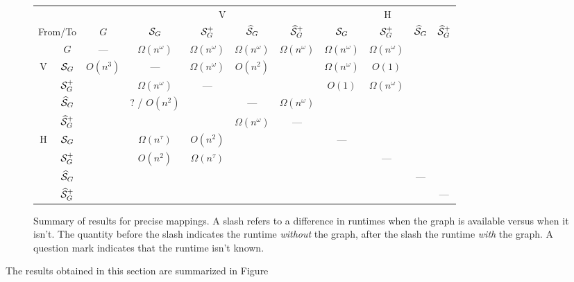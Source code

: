 \begin{figure}
	\centering
	\renewcommand{\arraystretch}{1.5}	\begin{tabular}{|c|c|c|c|c|c|c|c|c|c|c|}
		\hline 
		\multicolumn{3}{|c|}{} & \multicolumn{4}{c|}{\textsf{V}} & \multicolumn{4}{c|}{\textsf{H}}\\
	\cline{3-11} 
\multicolumn{2}{|r|}{From/To} & $G$ & $\mathcal{S}_G$ & $\mathcal{S}_G^+$ & $\widehat{\mathcal{S}}_G$ & $\widehat{\mathcal{S}}_G^+$ & $\mathcal{S}_G$ & $\mathcal{S}_G^+$ & $\widehat{\mathcal{S}}_G$ & $\widehat{\mathcal{S}}_G^+$ \\
\cline{2-11} 
& $G$ & --- &$\Omega(n^\omega)$ &$\Omega(n^\omega)$ &$\Omega(n^\omega)$ &$\Omega(n^\omega)$ & $\Omega(n^\omega)$ & $\Omega(n^\omega)$ &  & \\
\hline 
\multirow{4}{0.4cm}{\textsf{V}} & $\mathcal{S}_G$ & $O(n^3)$ & --- & $\Omega(n^\omega)$ & $O(n^2)$ & & $\Omega(n^\omega)$ & $O(1)$ & & \\
\cline{2-11}
& $\mathcal{S}_G^+$ & & $\Omega(n^\omega)$ & --- & & & $O(1)$ &$\Omega(n^\omega)$ & & \\
\cline{2-11}
& $\widehat{\mathcal{S}}_G$ & & ?  / $O(n^2)$ &  & --- & $\Omega(n^\omega)$ & & & &\\
\cline{2-11}
& $\widehat{\mathcal{S}}_G^+$ & & & &$\Omega(n^\omega)$ & --- & & & & \\
\hline 
\multirow{4}{0.4cm}{\textsf{H}} & $\mathcal{S}_G$ & & $\Omega(n^\tau)$ & $O(n^2)$ & & &--- & & & \\
\cline{2-11}
& $\mathcal{S}_G^+$ & & $O(n^2)$ & $\Omega(n^\tau)$ & & & & --- & & \\
\cline{2-11}
& $\widehat{\mathcal{S}}_G$ & & & & &  & & & --- &\\
\cline{2-11}
& $\widehat{\mathcal{S}}_G^+$ & & & & & & & & & --- \\
\hline 
	\end{tabular}
	\renewcommand{\arraystretch}{1}
\caption{Summary of results for precise mappings. A slash refers to a difference in runtimes when the graph is available versus when it isn't. The quantity before the slash indicates the runtime \emph{without} the graph, after the slash the runtime \emph{with} the graph. A question mark indicates that the runtime isn't known.}
\end{figure}

The results obtained in this section are summarized in Figure 


